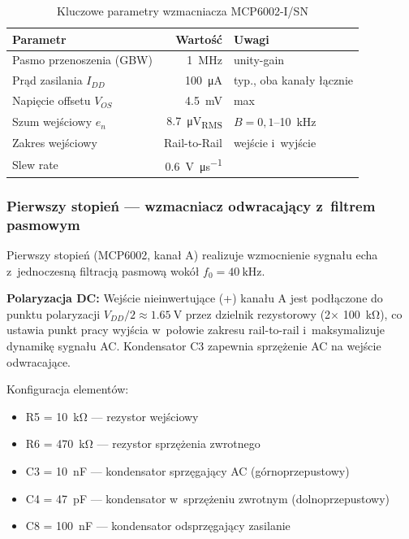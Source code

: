 \documentclass[a4paper,11pt]{article}
\begin{document}
\begin{table}[H]
    \centering
    \caption{Kluczowe parametry wzmacniacza MCP6002-I/SN}
    \label{tab:mcp6002}
    \begin{tabular}{lrl}
        \toprule
        \textbf{Parametr} & \textbf{Wartość} & \textbf{Uwagi} \\
        \midrule
        Pasmo przenoszenia (GBW) & \SI{1}{\mega\hertz} & unity-gain \\
        Prąd zasilania $I_{DD}$ & \SI{100}{\micro\ampere} & typ., oba kanały łącznie \\
        Napięcie offsetu $V_{OS}$ & \SI{4,5}{\milli\volt} & max \\
        Szum wejściowy $e_n$ & \SI{8,7}{\micro\volt_{RMS}} & $B = 0{,}1$--\SI{10}{\kilo\hertz} \\
        Zakres wejściowy & Rail-to-Rail & wejście i~wyjście \\
        Slew rate & \SI{0,6}{\volt\per\micro\second} & \\
        \bottomrule
    \end{tabular}
\end{table}

\subsubsection{Pierwszy stopień --- wzmacniacz odwracający z~filtrem pasmowym}

Pierwszy stopień (MCP6002, kanał A) realizuje wzmocnienie sygnału echa
z~jednoczesną filtracją pasmową wokół $f_0 = \SI{40}{\kilo\hertz}$.

\textbf{Polaryzacja DC:} Wejście nieinwertujące (+) kanału A jest podłączone
do punktu polaryzacji $V_{DD}/2 \approx \SI{1,65}{\volt}$ przez dzielnik
rezystorowy (2$\times$ \SI{100}{\kilo\ohm}), co ustawia punkt pracy wyjścia
w~połowie zakresu rail-to-rail i~maksymalizuje dynamikę sygnału AC.
Kondensator C3 zapewnia sprzężenie AC na wejście odwracające.

Konfiguracja elementów:
\begin{itemize}[nosep]
    \item R5 = \SI{10}{\kilo\ohm} --- rezystor wejściowy
    \item R6 = \SI{470}{\kilo\ohm} --- rezystor sprzężenia zwrotnego
    \item C3 = \SI{10}{\nano\farad} --- kondensator sprzęgający AC (górnoprzepustowy)
    \item C4 = \SI{47}{\pico\farad} --- kondensator w~sprzężeniu zwrotnym (dolnoprzepustowy)
    \item C8 = \SI{100}{\nano\farad} --- kondensator odsprzęgający zasilanie
\end{itemize}
\end{document}
